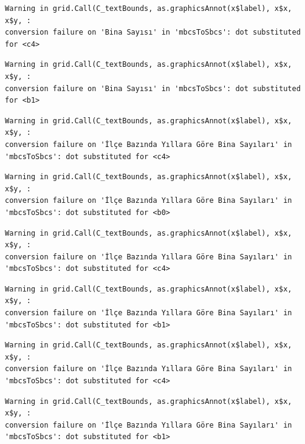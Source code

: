 \documentclass[
  11pt,
  a4paper,
  DIV=11,
  numbers=noendperiod]{scrartcl}
\begin{document}
\begin{verbatim}
Warning in grid.Call(C_textBounds, as.graphicsAnnot(x$label), x$x, x$y, :
conversion failure on 'Bina Sayısı' in 'mbcsToSbcs': dot substituted for <c4>
\end{verbatim}

\begin{verbatim}
Warning in grid.Call(C_textBounds, as.graphicsAnnot(x$label), x$x, x$y, :
conversion failure on 'Bina Sayısı' in 'mbcsToSbcs': dot substituted for <b1>
\end{verbatim}

\begin{verbatim}
Warning in grid.Call(C_textBounds, as.graphicsAnnot(x$label), x$x, x$y, :
conversion failure on 'İlçe Bazında Yıllara Göre Bina Sayıları' in
'mbcsToSbcs': dot substituted for <c4>
\end{verbatim}

\begin{verbatim}
Warning in grid.Call(C_textBounds, as.graphicsAnnot(x$label), x$x, x$y, :
conversion failure on 'İlçe Bazında Yıllara Göre Bina Sayıları' in
'mbcsToSbcs': dot substituted for <b0>
\end{verbatim}

\begin{verbatim}
Warning in grid.Call(C_textBounds, as.graphicsAnnot(x$label), x$x, x$y, :
conversion failure on 'İlçe Bazında Yıllara Göre Bina Sayıları' in
'mbcsToSbcs': dot substituted for <c4>
\end{verbatim}

\begin{verbatim}
Warning in grid.Call(C_textBounds, as.graphicsAnnot(x$label), x$x, x$y, :
conversion failure on 'İlçe Bazında Yıllara Göre Bina Sayıları' in
'mbcsToSbcs': dot substituted for <b1>
\end{verbatim}

\begin{verbatim}
Warning in grid.Call(C_textBounds, as.graphicsAnnot(x$label), x$x, x$y, :
conversion failure on 'İlçe Bazında Yıllara Göre Bina Sayıları' in
'mbcsToSbcs': dot substituted for <c4>
\end{verbatim}

\begin{verbatim}
Warning in grid.Call(C_textBounds, as.graphicsAnnot(x$label), x$x, x$y, :
conversion failure on 'İlçe Bazında Yıllara Göre Bina Sayıları' in
'mbcsToSbcs': dot substituted for <b1>
\end{verbatim}
\end{document}
